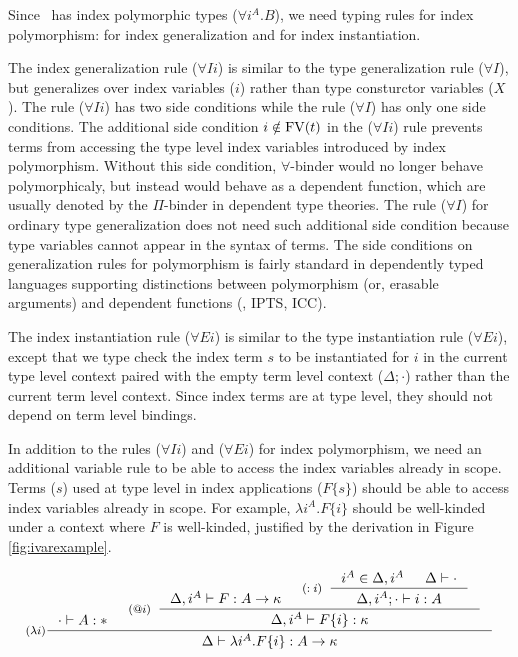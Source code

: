 Since \Fi\ has index polymorphic types ($\forall i^A . B$),
we need typing rules for index polymorphism:
 for index generalization
and  for index instantiation.

The index generalization rule ($\forall I i$) is similar to
the type generalization rule ($\forall I$), but generalizes over
index variables ($i$) rather than type consturctor variables ($X$).
The rule ($\forall I i$) has two side conditions
while the rule ($\forall I$) has only one side conditions.
The additional side condition $i\notin\mathop{\mathrm{FV}}(t)$ in the ($\forall I i$) rule
prevents terms from accessing the type level index variables introduced by
index polymorphism. Without this side condition, $\forall$-binder
would no longer behave polymorphicaly, but instead would behave as
a dependent function, which are usually denoted by the $\Pi$-binder in
dependent type theories. The rule ($\forall I$) for ordinary
type generalization does not need such additional side condition
because type variables cannot appear in the syntax of terms.
The side conditions on generalization rules for polymorphism is fairly standard
in dependently typed languages supporting distinctions between polymorphism
(or, erasable arguments) and dependent functions (\eg, IPTS\cite{LingerS08},
ICC\cite{Miquel01}).

The index instantiation rule ($\forall E i$) is similar to
the type instantiation rule ($\forall E i$), except that
we type check the index term $s$ to be instantiated for $i$
in the current type level context paired with the empty term level context
($\Delta;\cdot$) rather than the current term level context.
Since index terms are at type level, they should not depend on
term level bindings.

In addition to the rules ($\forall I i$) and ($\forall E i$) for
index polymorphism, we need an additional variable rule 
to be able to access the index variables already in scope. Terms ($s$) used
at type level in index applications ($F\{s\}$) should be able to access
index variables already in scope. For example, $\lambda i^A.F\{i\}$ should be
well-kinded under a context where $F$ is well-kinded,
justified by the derivation in Figure \ref{fig:ivarexample}.

\begin{figure*}
\[ \inference[($\lambda i$)]
      { \cdot |- A:* &
	\inference[($@i$)]{ \Delta, i^A |- F : A -> \kappa
                          & \inference[($:i$)]{ i^A\in \Delta,i^A
                                              & \Delta |- \cdot }
                                              {\Delta,i^A;\cdot |- i:A}
                          }
                          {\Delta, i^A |- F\{i\} : \kappa} }
      {\Delta |- \lambda i^A.F\{i\} :A -> \kappa}
\]
\caption{Kinding derivation for an index abstraction}
\label{fig:ivarexample}
\end{figure*}

